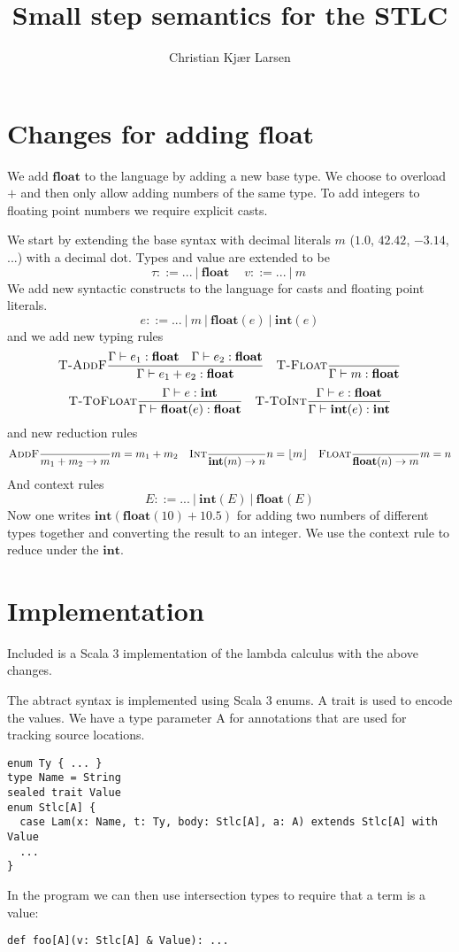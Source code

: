 \documentclass[11pt]{article}
\title{Small step semantics for the STLC}
\author{Christian Kjær Larsen}
\begin{document}
\maketitle
\section{Changes for adding $\mathbf{float}$}
We add $\mathbf{float}$ to the language by adding a new base type. We choose to overload $+$ and then only allow adding numbers of the same type. To add integers to floating point numbers we require explicit casts.

We start by extending the base syntax with decimal literals $m$ ($1.0$, $42.42$, $-3.14$, ...) with a decimal dot. Types and value are extended to be
\[
    \tau ::= ... \ |\ \mathbf{float}\ \quad
    v ::= ... \ |\ m\
\]
We add new syntactic constructs to the language for casts and floating point literals.
\[
    e ::= ... \ |\ m \ |\ \mathbf{float}(e)\ |\ \mathbf{int}(e)
\]
and we add new typing rules
\[
    \textsc{T-AddF}\frac{\Gamma \vdash e_1 : \mathbf{float}\quad \Gamma \vdash e_2 : \mathbf{float}}{\Gamma \vdash e_1 + e_2 : \mathbf{float}} \quad
    \textsc{T-Float}\frac{}{\Gamma \vdash m : \mathbf{float}}
\]
\[
    \textsc{T-ToFloat}\frac{\Gamma \vdash e : \mathbf{int}}{\Gamma \vdash \mathbf{float}(e) : \mathbf{float}} \quad
    \textsc{T-ToInt}\frac{\Gamma \vdash e : \mathbf{float}}{\Gamma \vdash \mathbf{int}(e) : \mathbf{int}}
\]
and new reduction rules
\[
    \textsc{AddF}\frac{}{m_1 + m_2 \rightarrow m}m = m_1 + m_2 \quad
    \textsc{Int}\frac{}{\mathbf{int}(m) \rightarrow n}n = \lfloor m \rfloor \quad
    \textsc{Float}\frac{}{\mathbf{float}(n) \rightarrow m}m = n
\]
And context rules
\[
    E ::= ...\ |\ \mathbf{int}(E) \ |\ \mathbf{float}(E)
\]
Now one writes $\mathbf{int}(\mathbf{float}(10) + 10.5)$ for adding two numbers of different types together and converting the result to an integer. We use the context rule to reduce under the $\mathbf{int}$.
\section{Implementation}
Included is a Scala 3 implementation of the lambda calculus with the above changes.

The abtract syntax is implemented using Scala 3 enums. A trait is used to encode the values. We have a type parameter A for annotations that are used for tracking source locations.
\begin{lstlisting}
enum Ty { ... }
type Name = String
sealed trait Value
enum Stlc[A] {
  case Lam(x: Name, t: Ty, body: Stlc[A], a: A) extends Stlc[A] with Value
  ...
}
\end{lstlisting}
In the program we can then use intersection types to require that a term is a value:
\begin{lstlisting}
def foo[A](v: Stlc[A] & Value): ...
\end{lstlisting}
\end{document}
